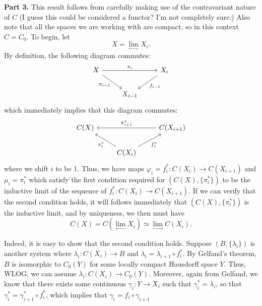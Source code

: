 \documentclass[aps,pra,showpacs,notitlepage,onecolumn,superscriptaddress,nofootinbib]{revtex4-1}
\theoremstyle{definition}
\begin{document}
\noindent \textbf{Part 3.} This result follows from carefully making use of the contravariant nature of $C$ (I guess this could be considered a functor? I'm not completely sure.) Also note that all the spaces we
are working with are compact, so in this context $C = C_0$. To begin, let
$$X = \lim_{\longleftarrow} X_i.$$
By definition,
the following diagram commutes:
\[\begin{tikzcd}
X && {X_i} \\
& {X_{i-1}}
\arrow["{\pi_{i-1}}"', from=1-1, to=2-2]
\arrow["{f_{i-1}}", from=1-3, to=2-2]
\arrow["{\pi_i}", from=1-1, to=1-3]
\end{tikzcd}\]
which immediately implies that this diagram commutes:
\[\begin{tikzcd}
	          {C(X)} && {C(X_{i+1})} \\
	          & {C(X_{i})} & {}
	          \arrow["{\pi_{i}^*}", from=2-2, to=1-1]
	          \arrow["{f_{i}^*}"', from=2-2, to=1-3]
	          \arrow["{\pi_{i+1}^*}"', from=1-3, to=1-1]
\end{tikzcd}\]
where we shift $i$ to be $1$. Thus, we have maps $\varphi_i = f_i^{*} : C(X_i) \rightarrow C(X_{i+1})$ and $\mu_i = \pi_i^{*}$ which satisfy the first condition required for $(C(X), \{\pi_i^{*}\})$ to be the inductive limit
of the sequence of $f_i^{*} : C(X_i) \rightarrow C(X_{i + 1})$. If we can verify that the second condition holds, it will follows immediately that $(C(X), \{\pi_i^{*}\})$ is the inductive limit, and by uniqueness, we then must have
$$C(X) = C(\lim_{\longleftarrow} X_i) \simeq \lim_{\longrightarrow} C(X_i).$$
\newline

\noindent Indeed, it is easy to show that the second condition holds. Suppose $(B, \{\lambda_i\})$ is another system where $\lambda_i : C(X_i) \rightarrow B$ and $\lambda_{i} = \lambda_{i + 1} \circ f_i^{*}$. By Gelfand's theorem,
$B$ is isomorphic to $C_0(Y)$ for some locally compact Hausdorff space $Y$. Thus, WLOG, we can assume $\lambda_i : C(X_i) \rightarrow C_0(Y)$. Moreover, again from Gelfand, we know that there exists some continuous $\gamma_i : Y \rightarrow X_i$
such that $\gamma_i^{*} = \lambda_i$, so that $\gamma_i^{*} = \gamma_{i + 1}^{*} \circ f_i^{*}$, which implies that $\gamma_i = f_i \circ \gamma_{i + 1}$
\end{document}

